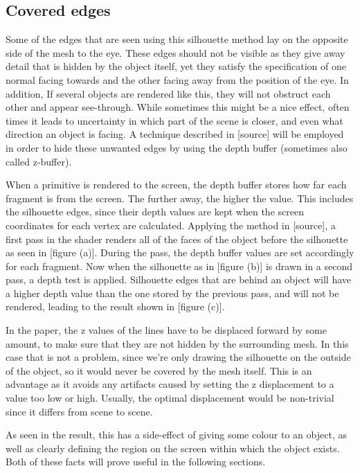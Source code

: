\documentclass[a4paper, 12pt]{article}
\begin{document}
\subsection{Covered edges}
Some of the edges that are seen using this silhouette method lay on the opposite side of the mesh to the eye. These edges should not be visible as they give away detail that is hidden by the object itself, yet they satisfy the specification of one normal facing towards and the other facing away from the position of the eye. In addition, If several objects are rendered like this, they will not obstruct each other and appear see-through. While sometimes this might be a nice effect, often times it leads to uncertainty in which part of the scene is closer, and even what direction an object is facing. A technique described in [source] will be employed in order to hide these unwanted edges by using the depth buffer (sometimes also called z-buffer).

When a primitive is rendered to the screen, the depth buffer stores how far each fragment is from the screen. The further away, the higher the value. This includes the silhouette edges, since their depth values are kept when the screen coordinates for each vertex are calculated. Applying the method in [source], a first pass in the shader renders all of the faces of the object before the silhouette as seen in [figure (a)]. During the pass, the depth buffer values are set accordingly for each fragment. Now when the silhouette as in [figure (b)] is drawn in a second pass, a depth test is applied. Silhouette edges that are behind an object will have a higher depth value than the one stored by the previous pass, and will not be rendered, leading to the result shown in [figure (c)].

In the paper, the z values of the lines have to be displaced forward by some amount, to make sure that they are not hidden by the surrounding mesh. In this case that is not a problem, since we're only drawing the silhouette on the outside of the object, so it would never be covered by the mesh itself. This is an advantage as it avoids any artifacts caused by setting the z displacement to a value too low or high. Usually, the optimal displacement would be non-trivial since it differs from scene to scene.

As seen in the result, this has a side-effect of giving some colour to an object, as well as clearly defining the region on the screen within which the object exists. Both of these facts will prove useful in the following sections.
\end{document}
